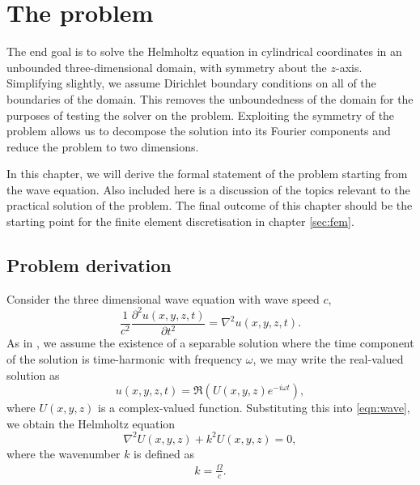 \chapter{The problem}
\label{sec:problem}

\iffalse

Background definitions, notations, etc.
Problem definition
	- Relation to Helmholtz
Boundary condition
	- Sommerfeld
	- PML/ABC/DtN
Shifted Laplace operator


The Poisson problem:
	- Well behaved
	- Eigenvalues of the residual
	- Optimal method for finding solution

Helmholtz problem:
	- Misbehaved
	- Poor convergence
	- Indefinite discretisation matrix
\fi

The end goal is to solve the Helmholtz equation in cylindrical coordinates in an unbounded three-dimensional domain, with symmetry about the $z$-axis.
Simplifying slightly, we assume Dirichlet boundary conditions on all of the boundaries of the domain.
This removes the unboundedness of the domain for the purposes of testing the solver on the problem.
Exploiting the symmetry of the problem allows us to decompose the solution into its Fourier components and reduce the problem to two dimensions.

In this chapter, we will derive the formal statement of the problem starting from the wave equation.
Also included here is a discussion of the topics relevant to the practical solution of the problem.
The final outcome of this chapter should be the starting point for the finite element discretisation in chapter \ref{sec:fem}.





\section{Problem derivation}

Consider the three dimensional wave equation with wave speed $c$,
\begin{equation}
	\frac{1}{c^2} \frac{\partial^2 u(x,y,z,t)}{\partial t^2} = \nabla^2 u(x,y,z,t). \label{eqn:wave}
\end{equation}
As in \cite{oomph_hh}, we assume the existence of a separable solution where the time component of the solution is time-harmonic with frequency $\omega$,
we may write the real-valued solution as
\[
	u(x,y,z,t) = \Re \left( U(x,y,z)e^{-i\omega t} \right),
\]
where $U(x,y,z)$ is a complex-valued function.
Substituting this into \eqref{eqn:wave}, we obtain the Helmholtz equation
\begin{equation}
	\nabla^2 U(x,y,z) + k^2 U(x,y,z) = 0, \label{eqn:hh}
\end{equation}
where the wavenumber $k$ is defined as
\begin{align}
	k = \frac{\Omega}{c}.
\end{align}

